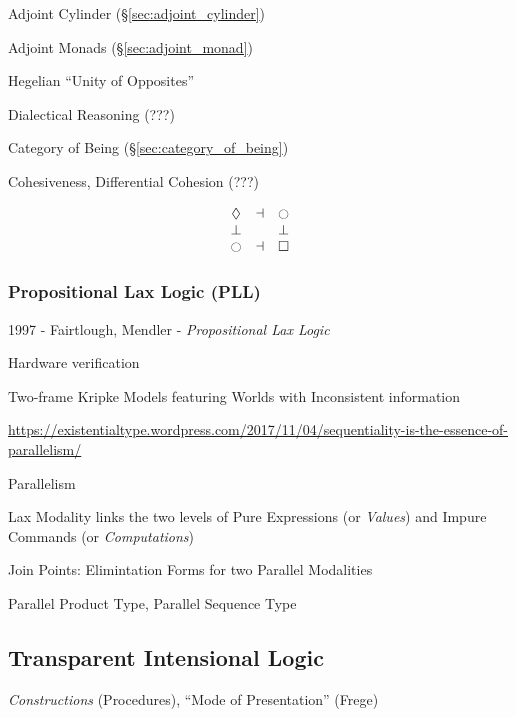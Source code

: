 Adjoint Cylinder (\S\ref{sec:adjoint_cylinder})

Adjoint Monads (\S\ref{sec:adjoint_monad})

Hegelian ``Unity of Opposites''

Dialectical Reasoning (???) %

Category of Being (\S\ref{sec:category_of_being})

Cohesiveness, Differential Cohesion (???)

\[
  \begin{matrix}
    \lozenge & \dashv & \ocircle \\
    \bot & \empty & \bot \\
    \ocircle & \dashv & \square
  \end{matrix}
\]



\subsubsection{Propositional Lax Logic (PLL)}\label{sec:pll}

1997 - Fairtlough, Mendler - \emph{Propositional Lax Logic}

Hardware verification

Two-frame Kripke Models featuring Worlds with Inconsistent information

\url{https://existentialtype.wordpress.com/2017/11/04/sequentiality-is-the-essence-of-parallelism/}

Parallelism

Lax Modality links the two levels of Pure Expressions (or \emph{Values}) and
Impure Commands (or \emph{Computations})

Join Points: Elimintation Forms for two Parallel Modalities

Parallel Product Type, Parallel Sequence Type



\subsection{Transparent Intensional Logic}
\label{sec:transparent_intensional_logic}

\emph{Constructions} (Procedures), ``Mode of Presentation'' (Frege)



